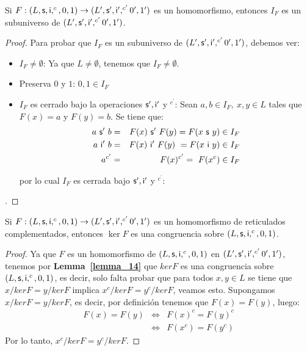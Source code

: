   \begin{lemma} \label{lemma_17}
    \PN Si $F: (L, \mathsf{s}, \mathsf{i}, ^{c}, 0, 1) \rightarrow (L^{\prime}, \mathsf{s}^{\prime}, \mathsf{i}^{\prime}, ^{c^{\prime}} 0^{\prime}, 1^{\prime})$ es un homomorfismo, entonces $I_{F}$ es un subuniverso de
    $(L^{\prime}, \mathsf{s}^{\prime}, \mathsf{i}^{\prime}, ^{c^{\prime}} 0^{\prime}, 1^{\prime})$.
  \end{lemma}
  \begin{proof}
    \PN Para probar que $I_{F}$ es un subuniverso de $(L^{\prime}, \mathsf{s}^{\prime}, \mathsf{i}^{\prime}, ^{c^{\prime}} 0^{\prime}, 1^{\prime})$, debemos ver:
    \begin{itemize}
      \item $I_{F} \neq \emptyset$: Ya que $L \neq \emptyset$, tenemos que $I_{F} \neq \emptyset$.
      \item Preserva $0$ y $1$: $0, 1 \in I_{F}$
      \item $I_{F}$ es cerrado bajo la operaciones $\mathsf{s}^{\prime}, \mathsf{i}^{\prime}$ y $^{c^{\prime}}$: Sean $a, b \in I_{F},
      \ x, y \in L$ tales que $F(x) = a$ y $F(y) = b$. Se tiene que:
      \begin{eqnarray*}
        a \ \mathsf{s}^{\prime} \ b &=& F(x) \ \mathsf{s}^{\prime} \ F(y) = F(x \ \mathsf{s} \ y) \in I_{F} \\
        a \ \mathsf{i}^{\prime} \ b &=& F(x) \ \mathsf{i}^{\prime} \ F(y) \ = F(x \ \mathsf{i} \ y) \in I_{F} \\
        a^{c^{\prime}} &=& F(x)^{c^{\prime}} = \ F(x^{c}) \in I_{F}
      \end{eqnarray*}

      \PN por lo cual $I_{F}$ es cerrada bajo $\mathsf{s}^{\prime}, \mathsf{i}^{\prime}$ y $^{c^{\prime}}$:
    \end{itemize}.
  \end{proof}

  \begin{lemma} \label{lemma_18}
    \PN Si $F: (L, \mathsf{s}, \mathsf{i}, ^{c}, 0, 1) \rightarrow (L^{\prime}, \mathsf{s}^{\prime}, \mathsf{i}^{\prime}, ^{c^{\prime}} 0^{\prime}, 1^{\prime})$ es un homomorfismo de reticulados complementados,
    entonces $\ker F$ es una congruencia sobre $(L, \mathsf{s}, \mathsf{i}, ^{c}, 0, 1)$.
  \end{lemma}
  \begin{proof}
    \PN Ya que $F$ es un homomorfismo de $(L, \mathsf{s}, \mathsf{i}, ^{c}, 0, 1)$ en $(L^{\prime}, \mathsf{s}^{\prime}, \mathsf{i}^{\prime}, ^{c^{\prime}} 0^{\prime}, 1^{\prime})$, tenemos por
    \textbf{Lemma~\ref{lemma_14}} que $ker F$ es una congruencia sobre $(L, \mathsf{s}, \mathsf{i}, ^{c}, 0, 1)$, es decir, solo falta probar que
    para todos $x, y \in L$ se tiene que $x / ker F = y / ker F$ implica $x^{c} / ker F = y^{c} / ker F$, veamos esto.
    Supongamos $x / ker F = y / ker F$, es decir, por definición tenemos que $F(x) = F(y)$, luego:
    \begin{eqnarray*}
      F(x) = F(y) &\Leftrightarrow & F(x)^{c} = F(y)^{c} \\
      &\Leftrightarrow & F(x^{c}) = F(y^{c})
    \end{eqnarray*}
    \PN Por lo tanto, $x^{c} / ker F = y^{c} / ker F$.
  \end{proof}

